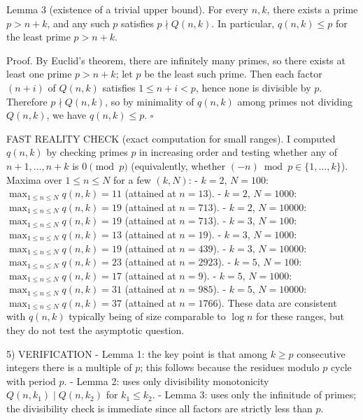 Lemma 3 (existence of a trivial upper bound).
For every $n,k$, there exists a prime $p>n+k$, and any such $p$ satisfies $p\nmid Q(n,k)$. In particular, $q(n,k)\le p$ for the least prime $p>n+k$.

Proof.
By Euclid's theorem, there are infinitely many primes, so there exists at least one prime $p>n+k$; let $p$ be the least such prime.
Then each factor $(n+i)$ of $Q(n,k)$ satisfies $1\le n+i < p$, hence none is divisible by $p$. Therefore $p\nmid Q(n,k)$, so by minimality of $q(n,k)$ among primes not dividing $Q(n,k)$, we have $q(n,k)\le p$. $\square$

FAST REALITY CHECK (exact computation for small ranges).
I computed $q(n,k)$ by checking primes $p$ in increasing order and testing whether any of $n+1,\ldots,n+k$ is $0\pmod p$ (equivalently, whether $(-n)\bmod p\in\{1,\ldots,k\}$).
Maxima over $1\le n\le N$ for a few $(k,N)$:
- $k=2$, $N=100$: $\max_{1\le n\le N} q(n,k) = 11$ (attained at $n=13$).
- $k=2$, $N=1000$: $\max_{1\le n\le N} q(n,k) = 19$ (attained at $n=713$).
- $k=2$, $N=10000$: $\max_{1\le n\le N} q(n,k) = 19$ (attained at $n=713$).
- $k=3$, $N=100$: $\max_{1\le n\le N} q(n,k) = 13$ (attained at $n=19$).
- $k=3$, $N=1000$: $\max_{1\le n\le N} q(n,k) = 19$ (attained at $n=439$).
- $k=3$, $N=10000$: $\max_{1\le n\le N} q(n,k) = 23$ (attained at $n=2923$).
- $k=5$, $N=100$: $\max_{1\le n\le N} q(n,k) = 17$ (attained at $n=9$).
- $k=5$, $N=1000$: $\max_{1\le n\le N} q(n,k) = 31$ (attained at $n=985$).
- $k=5$, $N=10000$: $\max_{1\le n\le N} q(n,k) = 37$ (attained at $n=1766$).
These data are consistent with $q(n,k)$ typically being of size comparable to $\log n$ for these ranges, but they do not test the asymptotic question.

5) VERIFICATION
- Lemma 1: the key point is that among $k\ge p$ consecutive integers there is a multiple of $p$; this follows because the residues modulo $p$ cycle with period $p$.
- Lemma 2: uses only divisibility monotonicity $Q(n,k_1)\mid Q(n,k_2)$ for $k_1\le k_2$.
- Lemma 3: uses only the infinitude of primes; the divisibility check is immediate since all factors are strictly less than $p$.

